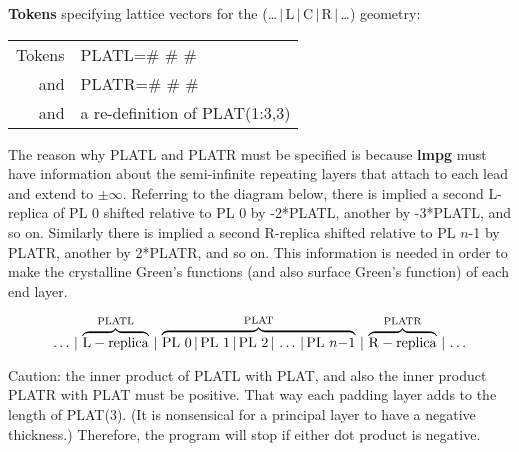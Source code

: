 \documentclass{article}
\begin{document}
\noindent
{\bf Tokens} specifying lattice vectors for the
(\dots\,$|$\,L\,$|$\,C\,$|$\,R\,$|$\,\dots) geometry:

\begin{tabular}{rl}
Tokens & PLATL=\# \# \#\\
and    & PLATR=\# \# \#\\
and    & a re-definition of PLAT(1:3,3)
\end{tabular}


\vskip 12pt
\noindent
The reason why PLATL and PLATR must be specified is because
{\bf{}lmpg} must have information about the semi-infinite
repeating layers that attach to each lead and extend to
$\pm{}\infty$.  Referring to the diagram below, there is implied
a second L-replica of PL 0 shifted relative to PL 0 by -2*PLATL,
another by -3*PLATL, and so on.  Similarly there is implied a
second R-replica shifted relative to PL $n$-1 by PLATR, another
by 2*PLATR, and so on.  This information is needed in order to
make the crystalline Green's functions (and also surface Green's
function) of each end layer.

\[
  \ldots \,|\,
 \overbrace{\rm L-replica}^{\rm PLATL}\,|\,
 \overbrace{{\rm PL}\ 0 \,|\, {\rm PL}\ 1 \,|\, {\rm PL}\ 2 \,|\,  \ldots \,|\, {\rm PL}\ n{\rm{-}}1}^{\rm PLAT}\,|\,
 \overbrace{\rm R-replica}^{\rm PLATR}\,|\, \ldots
\]

\vskip 12pt
\noindent
Caution: the inner product of PLATL with PLAT, and also the inner
product PLATR with PLAT must be positive.  That way each padding
layer adds to the length of PLAT(3).  (It is nonsensical for a
principal layer to have a negative thickness.)  Therefore, the
program will stop if either dot product is negative.
\end{document}
